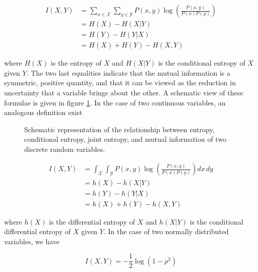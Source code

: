 \begin{align}
    I(X, Y) &= \sum_{x\in\mathcal X}\sum_{y\in\mathcal Y}
    P(x, y) \log\left(\frac{P(x, y)}{P(x)P(y)}\right)\label{eq:mi_discrete}\\
    &= H(X) - H(X|Y)\\
    &= H(Y) - H(Y|X)\\
    &=H(X) + H(Y) - H(X, Y)
\end{align}

where $H(X)$ is the entropy of $X$ and $H(X|Y)$ is the conditional entropy of
$X$ given $Y$\parencite{shannon1948mathematical}. The two last equalities
indicate that the mutual information is a symmetric, positive quantity, and
that it can be viewed as the reduction in uncertainty that a variable brings
about the other. A schematic view of these formulae is given in figure
\ref{fig:mi_schematic}. In the case of two continuous variables, an analogous
definition exist \parencite{kolmogorov1956shannon}

\begin{figure}
    \centering
    \caption{Schematic representation of the relationship between entropy,
    conditional entropy, joint entropy, and mutual information of two discrete
    random variables.}
    \label{fig:mi_schematic}
\end{figure}

\begin{align}
    I(X, Y) &= \int_\mathcal X\int_\mathcal Y
    P(x, y) \log\left(\frac{P(x, y)}{P(x)P(y)}\right)dx\,dy\\
    &= h(X) - h(X|Y)\\
    &= h(Y) - h(Y|X)\\
    &= h(X) + h(Y) - h(X, Y)
\end{align}

where $h(X)$ is the differential entropy of $X$ and $h(X|Y)$ is the conditional
differential entropy of $X$ given $Y$. In the case of two normally distributed
variables, we have

\begin{equation}
    \label{eq:mi_gaussian}
    I(X,Y)=-\frac{1}{2}\log(1-\rho^2)
\end{equation}

